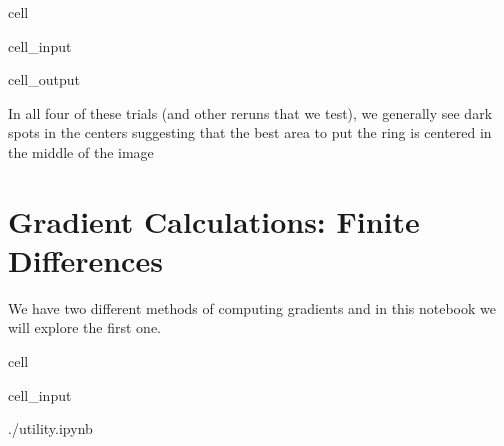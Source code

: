 \documentclass[letterpaper,10pt,english]{jupyterBook}
\begin{document}
\begin{sphinxuseclass}{cell}\begin{sphinxVerbatimInput}

\begin{sphinxuseclass}{cell_input}
\begin{sphinxVerbatim}[commandchars=\\\{\}]
   
  
\end{sphinxVerbatim}

\end{sphinxuseclass}\end{sphinxVerbatimInput}
\begin{sphinxVerbatimOutput}

\begin{sphinxuseclass}{cell_output}
\noindent{}

\end{sphinxuseclass}\end{sphinxVerbatimOutput}

\end{sphinxuseclass}
\sphinxAtStartPar
In all four of these trials (and other reruns that we test), we generally see dark spots in the centers suggesting that the best area to put the ring is centered in the middle of the image

\sphinxstepscope


\chapter{Gradient Calculations: Finite Differences}
\label{\detokenize{finite_gradient:gradient-calculations-finite-differences}}\label{\detokenize{finite_gradient::doc}}
\sphinxAtStartPar
We have two different methods of computing gradients and in this notebook we will explore the first one.

\begin{sphinxuseclass}{cell}\begin{sphinxVerbatimInput}

\begin{sphinxuseclass}{cell_input}
\begin{sphinxVerbatim}[commandchars=\\\{\}]
 ./utility.ipynb
\end{sphinxVerbatim}

\end{sphinxuseclass}\end{sphinxVerbatimInput}

\end{sphinxuseclass}
\end{document}
